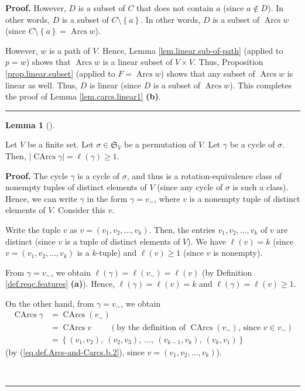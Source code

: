 \documentclass[numbers=enddot,12pt,final,onecolumn,notitlepage]{scrartcl}%
\numberwithin{exer}{section}
\theoremstyle{definition}
\newtheorem{lem}[theo]{Lemma}
\newenvironment{lemma}[1][]
{\begin{lem}[#1]\begin{leftbar}}
{\end{leftbar}\end{lem}}
\newenvironment{proof}[1][Proof]{\noindent\textbf{#1.} }{\ \rule{0.5em}{0.5em}}
\newenvironment{verlong}{}{}
\begin{document}
\begin{verlong}
\begin{proof}
However, $D$ is a subset of $C$ that does not contain $a$ (since $a\notin D$).
In other words, $D$ is a subset of $C\setminus\left\{  a\right\}  $. In other
words, $D$ is a subset of $\operatorname*{Arcs}w$ (since $C\setminus\left\{
a\right\}  =\operatorname*{Arcs}w$).

However, $w$ is a path of $V$. Hence, Lemma \ref{lem.linear.sub-of-path}
(applied to $p=w$) shows that $\operatorname*{Arcs}w$ is a linear subset of
$V\times V$. Thus, Proposition \ref{prop.linear.subset} (applied to
$F=\operatorname*{Arcs}w$) shows that any subset of $\operatorname*{Arcs}w$ is
linear as well. Thus, $D$ is linear (since $D$ is a subset of
$\operatorname*{Arcs}w$). This completes the proof of Lemma
\ref{lem.carcs.linear1} \textbf{(b)}.
\end{proof}

\begin{lemma}
\label{lem.carcs.len=num}Let $V$ be a finite set. Let $\sigma\in
\mathfrak{S}_{V}$ be a permutation of $V$. Let $\gamma$ be a cycle of $\sigma
$. Then, $\left\vert \operatorname*{CArcs}\gamma\right\vert =\ell\left(
\gamma\right)  \geq1$.
\end{lemma}

\begin{proof}
The cycle $\gamma$ is a cycle of $\sigma$, and thus is a rotation-equivalence
class of nonempty tuples of distinct elements of $V$ (since any cycle of
$\sigma$ is such a class). Hence, we can write $\gamma$ in the form
$\gamma=v_{\sim}$, where $v$ is a nonempty tuple of distinct elements of $V$.
Consider this $v$.

Write the tuple $v$ as $v=\left(  v_{1},v_{2},\ldots,v_{k}\right)  $. Then,
the entries $v_{1},v_{2},\ldots,v_{k}$ of $v$ are distinct (since $v$ is a
tuple of distinct elements of $V$). We have $\ell\left(  v\right)  =k$ (since
$v=\left(  v_{1},v_{2},\ldots,v_{k}\right)  $ is a $k$-tuple) and $\ell\left(
v\right)  \geq1$ (since $v$ is nonempty).

From $\gamma=v_{\sim}$, we obtain $\ell\left(  \gamma\right)  =\ell\left(
v_{\sim}\right)  =\ell\left(  v\right)  $ (by Definition
\ref{def.reqc.features} \textbf{(a)}). Hence, $\ell\left(  \gamma\right)
=\ell\left(  v\right)  =k$ and $\ell\left(  \gamma\right)  =\ell\left(
v\right)  \geq1$.

On the other hand, from $\gamma=v_{\sim}$, we obtain%
\begin{align*}
\operatorname*{CArcs}\gamma &  =\operatorname*{CArcs}\left(  v_{\sim}\right)
\\
&  =\operatorname*{CArcs}v\ \ \ \ \ \ \ \ \ \ \left(  \text{by the definition
of }\operatorname*{CArcs}\left(  v_{\sim}\right)  \text{, since }v\in v_{\sim
}\right) \\
&  =\left\{  \left(  v_{1},v_{2}\right)  ,\ \left(  v_{2},v_{3}\right)
,\ \ldots,\ \left(  v_{k-1},v_{k}\right)  ,\ \left(  v_{k},v_{1}\right)
\right\}
\end{align*}
(by (\ref{eq.def.Arcs-and-Carcs.b.2}), since $v=\left(  v_{1},v_{2}%
,\ldots,v_{k}\right)  $).


\end{proof}
\end{verlong}
\end{document}
